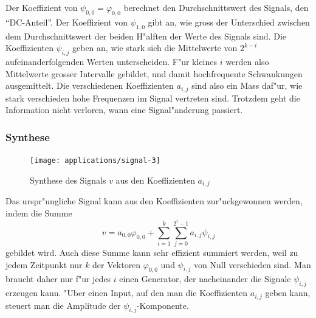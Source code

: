Der Koeffizient von $\psi_{0,0}=\varphi_{0,0}$ berechnet
den Durchschnittswert des Signals, den ``DC-Anteil''.
Der Koeffizient von $\psi_{1,0}$ gibt an, wie gross der Unterschied 
zwischen dem Durchschnittswert der beiden H"alften der Werte
des Signals sind.
Die Koeffizienten $\psi_{i,j}$ geben an, wie stark sich die Mittelwerte
von $2^{k-i}$ aufeinanderfolgenden Werten unterscheiden.
F"ur kleines $i$ werden also Mittelwerte grosser Intervalle
gebildet, und damit hochfrequente Schwankungen ausgemittelt.
Die verschiedenen Koeffizienten $a_{i,j}$ sind also ein Mass
daf"ur, wie stark verschieden hohe Frequenzen im Signal
vertreten sind. Trotzdem geht die Information nicht verloren,
wann eine Signal"anderung passiert.

\subsubsection{Synthese}
\begin{figure}
\begin{center}
\texttt{[image: applications/signal-3]}
\end{center}
\caption{Synthese des Signals $v$ aus den Koeffizienten $a_{i,j}$
\label{waveletsynthesis}}
\end{figure}
Das urspr"ungliche Signal kann aus den Koeffizienten zur"uckgewonnen werden,
indem die Summe
$$
v=a_{0,0}\varphi_{0,0}+\sum_{i=1}^k\sum_{j=0}^{2^i-1}a_{i,j}\psi_{i,j}
$$
gebildet wird. 
Auch diese Summe kann sehr effizient summiert werden, weil zu jedem
Zeitpunkt nur $k$ der Vektoren $\varphi_{0,0}$ und $\psi_{i,j}$
von Null verschieden sind.
Man braucht daher nur f"ur jedes $i$ einen Generator, der
nacheinander die Signale $\psi_{i,j}$ erzeugen kann. "Uber
einen Input, auf den man die Koeffizienten $a_{i,j}$ geben
kann, steuert man die Amplitude der $\psi_{i,j}$-Komponente.
